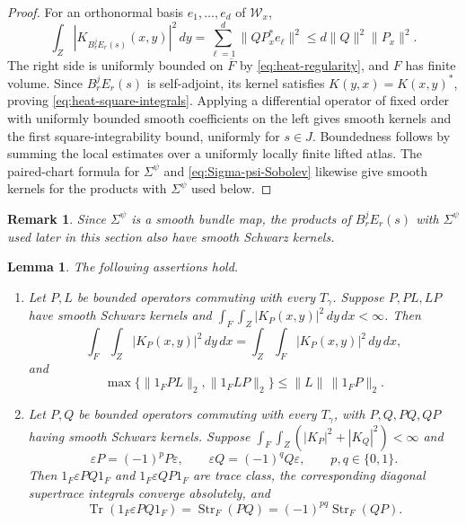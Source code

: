 \documentclass[12pt,reqno]{amsart}
\numberwithin{equation}{section}
\newtheorem{lemma}[theorem]{Lemma}
\newtheorem{remark}[theorem]{Remark}
\theoremstyle{definition}
\newcommand{\Str}{\operatorname{Str}}
\newcommand{\Tr}{\operatorname{Tr}}
\newcommand{\cW}{\mathscr W}
\begin{document}
\begin{proof}
For an orthonormal basis $e_1,\ldots,e_d$ of $\cW_x$,
\[
 \int_Z|K_{B_r^jE_r(s)}(x,y)|^2\,dy
 =\sum_{\ell=1}^d\|QP_x^*e_\ell\|^2
 \leq d\|Q\|^2\|P_x\|^2.
\]
The right side is uniformly bounded on $\overline F$ by
\eqref{eq:heat-regularity}, and $F$ has finite volume.  Since
$B_r^jE_r(s)$ is self-adjoint, its kernel satisfies
$K(y,x)=K(x,y)^*$, proving \eqref{eq:heat-square-integrals}.
Applying a differential operator of fixed order with uniformly bounded
smooth coefficients on the left gives smooth kernels and the first
square-integrability bound, uniformly for $s\in J$. Boundedness follows
by summing the local estimates over a uniformly locally finite lifted
atlas.  The paired-chart formula for $\Sigma^\psi$ and
\eqref{eq:Sigma-psi-Sobolev} likewise give smooth kernels for the
products with $\Sigma^\psi$ used below.
\end{proof}

\begin{remark}
Since $\Sigma^\psi$ is a smooth bundle map, the products of
$B_r^jE_r(s)$ with $\Sigma^\psi$ used later in this section also
have smooth Schwarz kernels.
\end{remark}





\begin{lemma}\label{lem:trace-identities}
The following assertions hold.
\begin{enumerate}[label=\textup{(\roman*)},leftmargin=2.8em]
\item\label{trace:factors}
Let $P,L$ be bounded operators commuting with every $T_\gamma$.
Suppose $P,PL,LP$ have smooth Schwarz kernels and
$\int_F\int_Z|K_P(x,y)|^2\,dy\,dx<\infty$.  Then
\begin{equation}\label{eq:fundamental-domain-square-integrals}
 \int_F\!\int_Z|K_P(x,y)|^2\,dy\,dx
 =\int_Z\!\int_F|K_P(x,y)|^2\,dy\,dx,
\end{equation}
and
\begin{equation}\label{eq:bounded-factor}
 \max\{\|1_FPL\|_2,\|1_FLP\|_2\}
 \leq\|L\|\,\|1_FP\|_2.
\end{equation}
\item\label{trace:exchange}
Let $P,Q$ be bounded operators commuting with every $T_\gamma$,
with $P,Q,PQ,QP$ having smooth Schwarz kernels.  Suppose
$\int_F\int_Z(|K_P|^2+|K_Q|^2)<\infty$ and
\[
 \varepsilon P=(-1)^pP\varepsilon,\qquad
 \varepsilon Q=(-1)^qQ\varepsilon,\qquad p,q\in\{0,1\}.
\]
Then  $1_F\varepsilon PQ1_F$ and
$1_F\varepsilon QP1_F$ are trace class, the corresponding diagonal
supertrace integrals converge absolutely, and
\begin{equation}\label{eq:exchange}
 \Tr(1_F\varepsilon PQ1_F)=\Str_F(PQ)=(-1)^{pq}\Str_F(QP).
\end{equation}
\end{enumerate}
\end{lemma}
\end{document}
